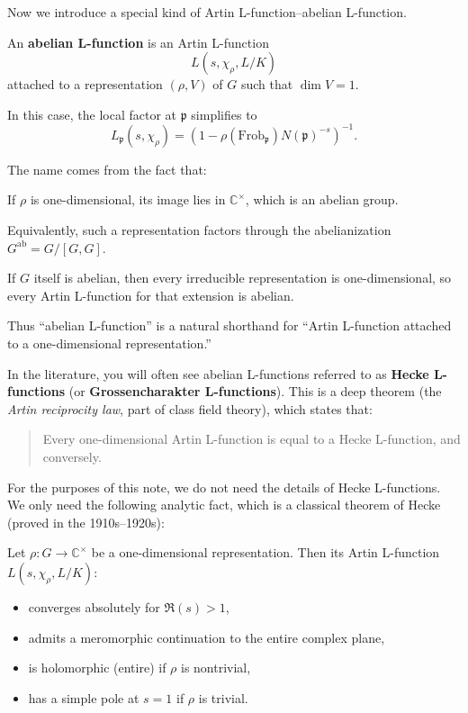 Now we introduce a special kind of Artin L-function--abelian L-function.

\begin{defn}
An \textbf{abelian L-function} is an Artin L-function 
\[
L(s, \chi_\rho, L/K)
\]
attached to a representation $(\rho,V)$ of $G$ such that \(\dim V = 1\). 

In this case, the local factor at \(\mathfrak{p}\) simplifies to
\[
L_{\mathfrak{p}}(s, \chi_\rho) = \left(1 - \rho(\mathrm{Frob}_{\mathfrak{p}}) N(\mathfrak{p})^{-s}\right)^{-1}.
\]
\end{defn}
\begin{remark}
The name comes from the fact that:

If \(\rho\) is one-dimensional, its image lies in \(\mathbb{C}^{\times}\), which is an abelian group.

Equivalently, such a representation factors through the abelianization \(G^{\mathrm{ab}} = G / [G,G]\).

If \(G\) itself is abelian, then every irreducible representation is one-dimensional, so every Artin L-function for that extension is abelian.

Thus ``abelian L-function'' is a natural shorthand for ``Artin L-function attached to a one-dimensional representation.''
\end{remark}


In the literature, you will often see abelian L-functions referred to as \textbf{Hecke L-functions} (or \textbf{Grossencharakter L-functions}). This is a deep theorem (the \emph{Artin reciprocity law}, part of class field theory), which states that:

\begin{quote}
Every one-dimensional Artin L-function is equal to a Hecke L-function, and conversely.
\end{quote}

For the purposes of this note, we do not need the details of Hecke L-functions. We only need the following analytic fact, which is a classical theorem of Hecke (proved in the 1910s–1920s):


\begin{thm}[Hecke]
Let \(\rho: G \to \mathbb{C}^{\times}\) be a one-dimensional representation. Then its Artin L-function \(L(s, \chi_\rho, L/K)\):
\begin{itemize}
    \item converges absolutely for \(\Re(s) > 1\),
    \item admits a meromorphic continuation to the entire complex plane,
    \item is holomorphic (entire) if \(\rho\) is nontrivial,
    \item has a simple pole at \(s = 1\) if \(\rho\) is trivial.
\end{itemize}
\end{thm}

